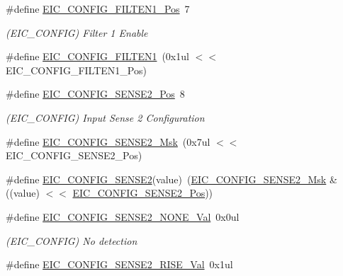 \begin{DoxyCompactItemize}
\item 
\#define \mbox{\hyperlink{group___s_a_m_d21___e_i_c_ga930f7f68f458eb61711fcad9b7b0e33d}{E\+I\+C\+\_\+\+C\+O\+N\+F\+I\+G\+\_\+\+F\+I\+L\+T\+E\+N1\+\_\+\+Pos}}~7
\begin{DoxyCompactList}\small\item\em (E\+I\+C\+\_\+\+C\+O\+N\+F\+IG) Filter 1 Enable \end{DoxyCompactList}\item 
\#define \mbox{\hyperlink{group___s_a_m_d21___e_i_c_gaed447b99e55e694beb50f9d65de606c3}{E\+I\+C\+\_\+\+C\+O\+N\+F\+I\+G\+\_\+\+F\+I\+L\+T\+E\+N1}}~(0x1ul $<$$<$ E\+I\+C\+\_\+\+C\+O\+N\+F\+I\+G\+\_\+\+F\+I\+L\+T\+E\+N1\+\_\+\+Pos)
\item 
\#define \mbox{\hyperlink{group___s_a_m_d21___e_i_c_gaf67e9a2938eae7c6f9f4d19c405e243f}{E\+I\+C\+\_\+\+C\+O\+N\+F\+I\+G\+\_\+\+S\+E\+N\+S\+E2\+\_\+\+Pos}}~8
\begin{DoxyCompactList}\small\item\em (E\+I\+C\+\_\+\+C\+O\+N\+F\+IG) Input Sense 2 Configuration \end{DoxyCompactList}\item 
\#define \mbox{\hyperlink{group___s_a_m_d21___e_i_c_gafba4355db43ca8318bc2ce2f6c8ae464}{E\+I\+C\+\_\+\+C\+O\+N\+F\+I\+G\+\_\+\+S\+E\+N\+S\+E2\+\_\+\+Msk}}~(0x7ul $<$$<$ E\+I\+C\+\_\+\+C\+O\+N\+F\+I\+G\+\_\+\+S\+E\+N\+S\+E2\+\_\+\+Pos)
\item 
\#define \mbox{\hyperlink{group___s_a_m_d21___e_i_c_gac962ab50d64cad7bdffe1589d05ea8fe}{E\+I\+C\+\_\+\+C\+O\+N\+F\+I\+G\+\_\+\+S\+E\+N\+S\+E2}}(value)~(\mbox{\hyperlink{group___s_a_m_d21___e_i_c_gafba4355db43ca8318bc2ce2f6c8ae464}{E\+I\+C\+\_\+\+C\+O\+N\+F\+I\+G\+\_\+\+S\+E\+N\+S\+E2\+\_\+\+Msk}} \& ((value) $<$$<$ \mbox{\hyperlink{group___s_a_m_d21___e_i_c_gaf67e9a2938eae7c6f9f4d19c405e243f}{E\+I\+C\+\_\+\+C\+O\+N\+F\+I\+G\+\_\+\+S\+E\+N\+S\+E2\+\_\+\+Pos}}))
\item 
\#define \mbox{\hyperlink{group___s_a_m_d21___e_i_c_ga89231a2e48fe64b47ec85f545280b7df}{E\+I\+C\+\_\+\+C\+O\+N\+F\+I\+G\+\_\+\+S\+E\+N\+S\+E2\+\_\+\+N\+O\+N\+E\+\_\+\+Val}}~0x0ul
\begin{DoxyCompactList}\small\item\em (E\+I\+C\+\_\+\+C\+O\+N\+F\+IG) No detection \end{DoxyCompactList}\item 
\#define \mbox{\hyperlink{group___s_a_m_d21___e_i_c_ga4c6f24459946c4c716e15f887cf91732}{E\+I\+C\+\_\+\+C\+O\+N\+F\+I\+G\+\_\+\+S\+E\+N\+S\+E2\+\_\+\+R\+I\+S\+E\+\_\+\+Val}}~0x1ul
$$
\end{DoxyCompactItemize}
